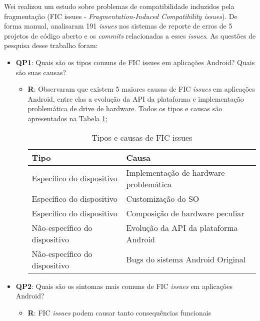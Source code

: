 Wei \cite{Wei2016} realizou um estudo sobre problemas de compatibilidade induzidos
pela fragmentação 
(FIC issues - \textit{Fragmentation-Induced Compatibility issues}).
De forma manual, analisaram 191 \textit{issues} nos sistemas de reporte de erros
de 5 projetos de código aberto e os \textit{commits} relacionadas a esses \textit{issues}.
As questões de pesquisa desse trabalho foram:
\begin{itemize}
	\item \textbf{QP1}: Quais são os tipos comuns de FIC issues em aplicações
	Android? Quais são suas causas?
	    \begin{itemize}
	        \item \textbf{R}: Observaram que existem 5 maiores causas de FIC \textit{issues}
	        em aplicações Android, entre elas a evolução da API da plataforma e implementação
	        problemática de drive de hardware. Todos os tipos e causas são apresentados
	        na Tabela \ref{tab:causas_FIC};
	        \begin{table}[h] %
              \caption{Tipos e causas de FIC issues \cite{Wei2016}}
              \begin{tabular}{ | l | l |}
                \hline %
                \textbf{Tipo} & \textbf{Causa}  \\ \hline
                Específico do dispositivo & Implementação de hardware problemática   \\ \hline
                Específico do dispositivo & Customização do SO \\ \hline
                Específico do dispositivo & Composição de hardware peculiar \\ \hline
                Não-específico do dispositivo & Evolução da API da plataforma Android \\ \hline
                Não-específico do dispositivo & Bugs do sistema Android Original \\ \hline
              \end{tabular}
              \label{tab:causas_FIC}
            \end{table}
	    \end{itemize}
	\item \textbf{QP2}: Quais são os sintomas mais comuns de FIC \textit{issues} em aplicações
	Android?
	    \begin{itemize}
	        \item \textbf{R}: FIC \textit{issues} podem causar tanto consequências funcionais

\end{itemize}
\end{itemize}
